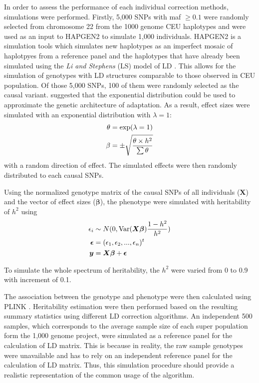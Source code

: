 		In order to assess the performance of each individual correction methods, simulations were performed.
		Firstly, 5,000 \glspl{SNP} with \gls{maf} $\ge0.1$ were randomly selected from chromosome 22 from the 1000 genome \gls{CEU} haplotypes and were used as an input to HAPGEN2 \citep{Su2011} to simulate 1,000 individuals.
		HAPGEN2 is a simulation tools which simulates new haplotypes as an imperfect mosaic of haplotpyes from a reference panel and the haplotypes that have already been simulated using the \textit{Li and Stephens} (LS) model of \gls{LD} \citep{Li2003}.
		This allows for the simulation of genotypes with \gls{LD} structures comparable to those observed in \gls{CEU} population. 
		Of those 5,000 \glspl{SNP}, 100 of them were randomly selected as the causal variant. 
		\citet{Orr1998} suggested that the exponential distribution could be used to approximate the genetic architecture of adaptation. 
		As a result, effect sizes were simulated with an exponential distribution with $\lambda=1$:
		\begin{align}
		\theta&=\mathrm{exp}(\lambda=1)\notag\\
		\beta&=\pm\sqrt{\frac{\theta \times h^2}{\sum \theta}}
		\label{eq:randomEffect}
		\end{align}
		with a random direction of effect.
		The simulated effects were then randomly distributed to each causal \glspl{SNP}.
			
		Using the normalized genotype matrix of the causal \glspl{SNP} of all individuals ($\boldsymbol{X}$) and the vector of effect sizes ($\boldsymbol{\beta}$), the phenotype were simulated with heritability of $h^2$ using
		\begin{align}
		\epsilon_i&\sim N(0,\mathrm{Var}(\boldsymbol{X\beta})\frac{1-h^2}{h^2} )\notag\\
		\boldsymbol{\epsilon} &= (\epsilon_1,\epsilon_2,...,\epsilon_n)^t\notag\\
		\boldsymbol{y} &= \boldsymbol{X\beta}+\boldsymbol{\epsilon}
		\label{eq:simulationOfPhenotype}
		\end{align}
		
		To simulate the whole spectrum of heritability, the $h^2$ were varied from 0 to 0.9 with increment of 0.1.
		
		The association between the genotype and phenotype were then calculated using PLINK \citep{Purcell2007}.
		Heritability estimation were then performed based on the resulting summary statistics using different \gls{LD} correction algorithms.
		An independent 500 samples, which corresponds to the average sample size of each super population form the 1,000 genome project, were simulated as a reference panel for the calculation of \gls{LD} matrix.
		This is because in reality, the raw sample genotypes were unavailable and has to rely on an independent reference panel for the calculation of \gls{LD} matrix. 
		Thus, this simulation procedure should provide a realistic representation of the common usage of the algorithm.
		
